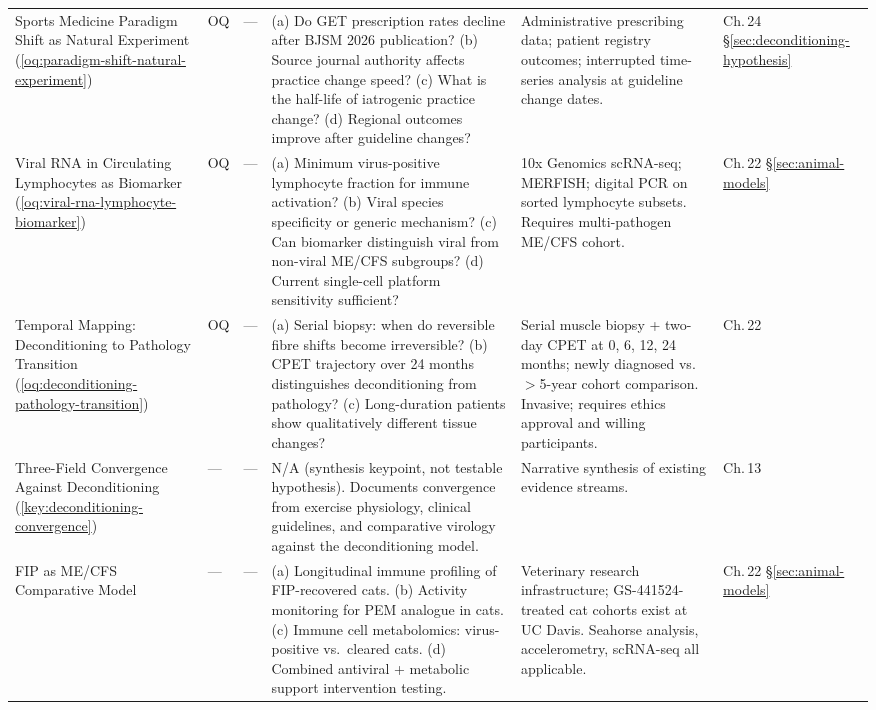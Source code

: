 \begin{longtable}{%
  p{3.0cm}
  >{\centering\arraybackslash}p{0.55cm}
  >{\centering\arraybackslash}p{1.0cm}
  p{3.8cm}
  p{3.8cm}
  p{2.2cm}
}
Sports Medicine Paradigm Shift as Natural Experiment
(\ref{oq:paradigm-shift-natural-experiment})
& OQ & --- &
(a) Do GET prescription rates decline after BJSM 2026 publication?
(b) Source journal authority affects practice change speed?
(c) What is the half-life of iatrogenic practice change?
(d) Regional outcomes improve after guideline changes?
&
Administrative prescribing data; patient registry outcomes;
interrupted time-series analysis at guideline change dates.
&
Ch.\,24 \S\ref{sec:deconditioning-hypothesis} \\[6pt]

Viral RNA in Circulating Lymphocytes as Biomarker
(\ref{oq:viral-rna-lymphocyte-biomarker})
& OQ & --- &
(a) Minimum virus-positive lymphocyte fraction for immune activation?
(b) Viral species specificity or generic mechanism?
(c) Can biomarker distinguish viral from non-viral ME/CFS subgroups?
(d) Current single-cell platform sensitivity sufficient?
&
10x Genomics scRNA-seq; MERFISH; digital PCR on sorted lymphocyte subsets.
Requires multi-pathogen ME/CFS cohort.
&
Ch.\,22 \S\ref{sec:animal-models} \\[6pt]

Temporal Mapping: Deconditioning to Pathology Transition
(\ref{oq:deconditioning-pathology-transition})
& OQ & --- &
(a) Serial biopsy: when do reversible fibre shifts become irreversible?
(b) CPET trajectory over 24 months distinguishes deconditioning from pathology?
(c) Long-duration patients show qualitatively different tissue changes?
&
Serial muscle biopsy + two-day CPET at 0, 6, 12, 24 months;
newly diagnosed vs.\ $>$5-year cohort comparison.
Invasive; requires ethics approval and willing participants.
&
Ch.\,22 \\[6pt]

Three-Field Convergence Against Deconditioning
(\ref{key:deconditioning-convergence})
& --- & --- &
N/A (synthesis keypoint, not testable hypothesis).
Documents convergence from exercise physiology, clinical guidelines,
and comparative virology against the deconditioning model.
&
Narrative synthesis of existing evidence streams.
&
Ch.\,13 \\[6pt]

FIP as ME/CFS Comparative Model
& --- & --- &
(a) Longitudinal immune profiling of FIP-recovered cats.
(b) Activity monitoring for PEM analogue in cats.
(c) Immune cell metabolomics: virus-positive vs.\ cleared cats.
(d) Combined antiviral + metabolic support intervention testing.
&
Veterinary research infrastructure;
GS-441524-treated cat cohorts exist at UC Davis.
Seahorse analysis, accelerometry, scRNA-seq all applicable.
&
Ch.\,22 \S\ref{sec:animal-models} \\[6pt]


\end{longtable}
